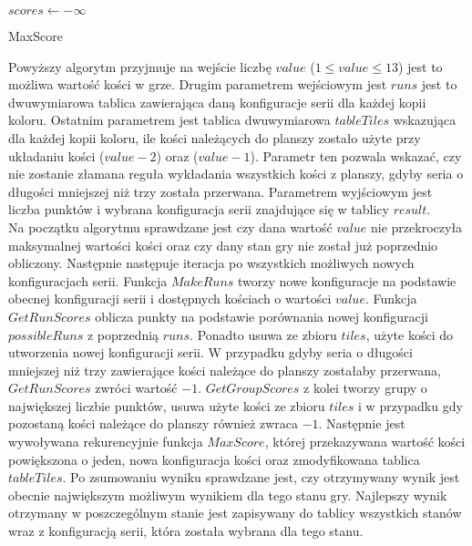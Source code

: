 \begin{pseudokod}[H]
	\vskip 1mm
	$scores \leftarrow -\infty$\;
	\caption{MaxScore}\label{alg:mine}
\end{pseudokod}
\vskip 3mm
Powyższy algorytm przyjmuje na wejście liczbę $value$ ($1 \le value \le 13$) jest to możliwa wartość kości w grze. Drugim parametrem wejściowym jest $runs$ jest to dwuwymiarowa tablica zawierająca daną konfiguracje serii dla każdej kopii koloru. Ostatnim parametrem jest tablica dwuwymiarowa $tableTiles$ wskazująca dla każdej kopii koloru, ile kości należących do planszy zostało użyte przy układaniu kości ($value-2$) oraz ($value-1$). Parametr ten pozwala wskazać, czy nie zostanie złamana reguła wykładania wszystkich kości z planszy, gdyby seria o długości mniejszej niż trzy została przerwana. Parametrem wyjściowym jest liczba punktów i wybrana konfiguracja serii znajdujące się w tablicy $result$. \\

Na początku algorytmu sprawdzane jest czy dana wartość $value$ nie przekroczyła maksymalnej wartości kości oraz czy dany stan gry nie został już poprzednio obliczony. Następnie następuje iteracja po wszystkich możliwych nowych konfiguracjach serii. Funkcja $MakeRuns$ tworzy nowe konfiguracje na podstawie obecnej konfiguracji serii i dostępnych kościach o wartości $value$. Funkcja $GetRunScores$ oblicza punkty na podstawie porównania nowej konfiguracji $possibleRuns$ z poprzednią $runs$. Ponadto usuwa ze zbioru $tiles$, użyte kości do utworzenia nowej konfiguracji serii. W przypadku gdyby seria o długości mniejszej niż trzy zawierające kości należące do planszy zostałaby przerwana, $GetRunScores$ zwróci wartość $-1$. $GetGroupScores$ z kolei tworzy grupy o największej liczbie punktów, usuwa użyte kości ze zbioru $tiles$ i w przypadku gdy pozostaną kości należące do planszy również zwraca $-1$. Następnie jest wywoływana rekurencyjnie funkcja $MaxScore$, której przekazywana wartość kości powiększona o jeden, nowa konfiguracja kości oraz zmodyfikowana tablica $tableTiles$. Po zsumowaniu wyniku sprawdzane jest, czy otrzymywany wynik jest obecnie największym możliwym wynikiem dla tego stanu gry.
Najlepszy wynik otrzymany w poszczególnym stanie jest zapisywany do tablicy wszystkich stanów wraz z konfiguracją serii, która została wybrana dla tego stanu. \\

